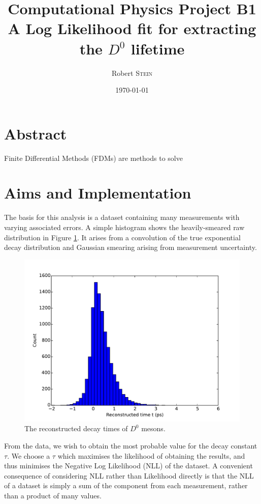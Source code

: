 \documentclass{article}
\title{Computational Physics Project B1\\A Log Likelihood fit for extracting the $D^{0}$ lifetime} %
\author{Robert \textsc{Stein}} %
\date{\today} %
\begin{document}
\maketitle %
\section{Abstract}
Finite Differential Methods (FDMs) are methods to solve 

\section{Aims and Implementation}
The basis for this analysis is a dataset containing many measurements with varying associated errors. A simple histogram shows the heavily-smeared raw distribution in Figure \ref{fig:decaytimes}. It arises from a convolution of the true exponential decay distribution and Gaussian smearing arising from measurement uncertainty. 
\begin{figure}
\begin{center}
\includegraphics[height=0.25\textheight]{decaytimes}
\caption{The reconstructed decay times of $D^{0}$ mesons.}
\label{fig:decaytimes}
\end{center}
\end{figure}

From the data, we wish to obtain the most probable value for the decay constant $\tau$. We choose a $\tau$ which maximises the likelihood of obtaining the results, and thus minimises the Negative Log Likelihood (NLL) of the dataset. A convenient consequence of considering NLL rather than Likelihood directly is that the NLL of a dataset is simply a sum of the component from each measurement, rather than a product of many values.
\end{document}

